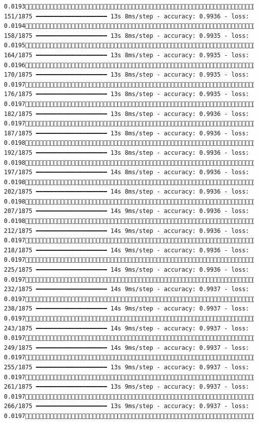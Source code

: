 \documentclass[
  letterpaper,
  DIV=11,
  numbers=noendperiod]{scrreprt}
\begin{document}
\begin{verbatim}
0.0193 151/1875 ━━━━━━━━━━━━━━━━━━━━ 13s 8ms/step - accuracy: 0.9936 - loss: 0.0194 158/1875 ━━━━━━━━━━━━━━━━━━━━ 13s 8ms/step - accuracy: 0.9935 - loss: 0.0195 164/1875 ━━━━━━━━━━━━━━━━━━━━ 13s 8ms/step - accuracy: 0.9935 - loss: 0.0196 170/1875 ━━━━━━━━━━━━━━━━━━━━ 13s 8ms/step - accuracy: 0.9935 - loss: 0.0197 176/1875 ━━━━━━━━━━━━━━━━━━━━ 13s 8ms/step - accuracy: 0.9935 - loss: 0.0197 182/1875 ━━━━━━━━━━━━━━━━━━━━ 13s 8ms/step - accuracy: 0.9936 - loss: 0.0197 187/1875 ━━━━━━━━━━━━━━━━━━━━ 13s 8ms/step - accuracy: 0.9936 - loss: 0.0198 192/1875 ━━━━━━━━━━━━━━━━━━━━ 13s 8ms/step - accuracy: 0.9936 - loss: 0.0198 197/1875 ━━━━━━━━━━━━━━━━━━━━ 14s 8ms/step - accuracy: 0.9936 - loss: 0.0198 202/1875 ━━━━━━━━━━━━━━━━━━━━ 14s 8ms/step - accuracy: 0.9936 - loss: 0.0198 207/1875 ━━━━━━━━━━━━━━━━━━━━ 14s 9ms/step - accuracy: 0.9936 - loss: 0.0198 212/1875 ━━━━━━━━━━━━━━━━━━━━ 14s 9ms/step - accuracy: 0.9936 - loss: 0.0197 218/1875 ━━━━━━━━━━━━━━━━━━━━ 14s 9ms/step - accuracy: 0.9936 - loss: 0.0197 225/1875 ━━━━━━━━━━━━━━━━━━━━ 14s 9ms/step - accuracy: 0.9936 - loss: 0.0197 232/1875 ━━━━━━━━━━━━━━━━━━━━ 14s 9ms/step - accuracy: 0.9937 - loss: 0.0197 238/1875 ━━━━━━━━━━━━━━━━━━━━ 14s 9ms/step - accuracy: 0.9937 - loss: 0.0197 243/1875 ━━━━━━━━━━━━━━━━━━━━ 14s 9ms/step - accuracy: 0.9937 - loss: 0.0197 249/1875 ━━━━━━━━━━━━━━━━━━━━ 14s 9ms/step - accuracy: 0.9937 - loss: 0.0197 255/1875 ━━━━━━━━━━━━━━━━━━━━ 13s 9ms/step - accuracy: 0.9937 - loss: 0.0197 261/1875 ━━━━━━━━━━━━━━━━━━━━ 13s 9ms/step - accuracy: 0.9937 - loss: 0.0197 266/1875 ━━━━━━━━━━━━━━━━━━━━ 13s 9ms/step - accuracy: 0.9937 - loss: 0.0197 
\end{verbatim}
\end{document}
